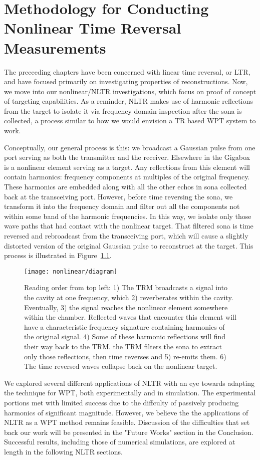 \chapter{Methodology for Conducting Nonlinear Time Reversal Measurements}
\label{ch:nonlinear-meth}

The preceeding chapters have been concerned with linear time reversal, or LTR, and have focused primarily on investigating properties of reconstructions. Now, we move into our nonlinear/NLTR investigations, which focus on proof of concept of targeting capabilities. As a reminder, NLTR makes use of harmonic reflections from the target to isolate it via frequency domain inspection after the sona is collected, a process similar to how we would envision a TR based WPT system to work. 

Conceptually, our general process is this: we broadcast a Gaussian pulse from one port serving as both the transmitter and the receiver. Elsewhere in the Gigabox is a nonlinear element serving as a target. Any reflections from this element will contain harmonics: frequency components at multiples of the original frequency. These harmonics are embedded along with all the other echos in sona collected back at the transceiving port. However, before time reversing the sona, we transform it into the frequency domain and filter out all the components not within some band of the harmonic frequencies. In this way, we isolate only those wave paths that had contact with the nonlinear target. That filtered sona is time reversed and rebroadcast from the transceiving port, which will cause a slightly distorted version of the original Gaussian pulse to reconstruct at the target. This process is illustrated in Figure~\ref{fig:nonlinear-diagram}.

\begin{figure}[h!]
\centering
\texttt{[image: nonlinear/diagram]}
    \caption[Conceptual overview of nonlinear time reversal]{Reading order from top left: 1) The TRM broadcasts a signal into the cavity at one frequency, which 2) reverberates within the cavity. Eventually, 3) the signal reaches the nonlinear element somewhere within the chamber. Reflected waves that encounter this element will have a characteristic frequency signature containing harmonics of the original signal. 4) Some of these harmonic reflections will find their way back to the TRM. the TRM filters the sona to extract only those reflections, then time reverses and 5) re-emits them. 6) The time reversed waves collapse back on the nonlinear target.}
    \label{fig:nonlinear-diagram}
\end{figure}

We explored several different applications of NLTR with an eye towards adapting the technique for WPT, both experimentally and in simulation. The experimental portions met with limited success due to the diffculty of passively producing harmonics of significant magnitude. However, we believe the the applications of NLTR as a WPT method remains feasible. Discussion of the difficulties that set back our work will be presented in the "Future Works" section in the Conclusion. Successful results, including those of numerical simulations, are explored at length in the following NLTR sections. 

